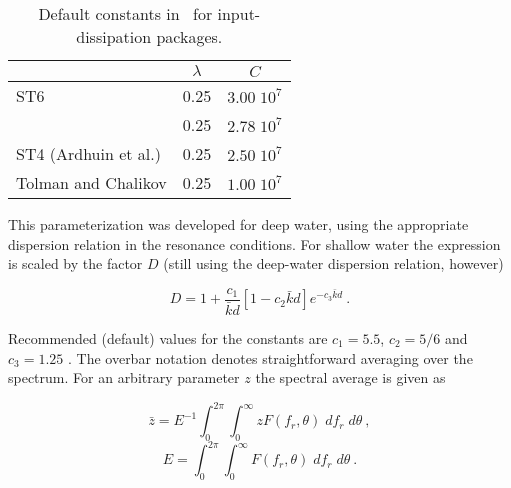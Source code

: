 
\begin{table} \begin{center}
 \begin{tabular}{|l|c|c|} \hline
                    & $\lambda$ &     $C$      \\ \hline
ST6                 &      0.25      & $3.00 \; 10^7$  \\ \hline
\wam-3              &      0.25      & $2.78 \; 10^7$  \\ \hline
ST4 (Ardhuin et al.)&      0.25      & $2.50 \; 10^7$  \\ \hline
Tolman and Chalikov &      0.25      & $1.00 \; 10^7$  \\ \hline
\end{tabular} \end{center}
\caption{Default constants in \dia\ for input-dissipation packages.}
\label{tab:snl_par} \botline \end{table}

This parameterization was developed for deep water, using the appropriate dispersion
relation in the resonance conditions. For shallow water the expression is
scaled by the factor $D$ (still using the deep-water dispersion relation,
however)


\begin{equation}
D = 1 + \frac{c_1}{\bar{k}d} \left [ 1 - c_2 \bar{k} d
\right ] e^{-c_3 \bar{k} d} \: . \label{eq:snl_shal}
\end{equation}

\noindent
Recommended (default) values for the constants are $c_1=5.5$, $c_2=5/6$ and
$c_3=1.25$ \citep{art:Hea85a}. The overbar notation denotes straightforward
averaging over the spectrum. For an arbitrary parameter $z$ the spectral average
is given as


\begin{equation}
\bar{z} = E^{-1} \int_{0}^{2\pi} \int_{0}^{\infty}
z F(f_r,\theta) \; d f_r \; d\theta \: , \label{eq:zbar}
\end{equation}
\begin{equation}
E = \int_{0}^{2\pi} \int_{0}^{\infty}
F(f_r,\theta) \; d f_r \; d\theta \: . \label{eq:etot}
\end{equation}

